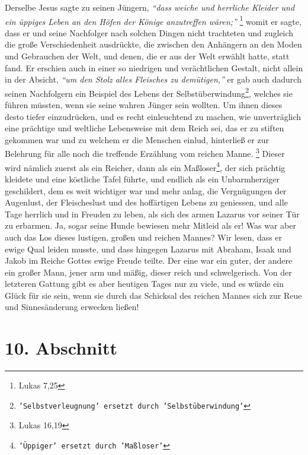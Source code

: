 Derselbe Jesus sagte
zu seinen Jüngern,
\textit{"`dass weiche und herrliche Kleider und ein üppiges Leben an
den Höfen der Könige anzutreffen wären;"'}
\footnote{Lukas 7,25}
womit er sagte,
dass er und seine Nachfolger nach solchen Dingen nicht trachteten und zugleich
die große Verschiedenheit ausdrückte, die zwischen den Anhängern an den Moden
und Gebrauchen der Welt, und denen, die er aus der Welt erwählt hatte, statt
fand. Er erschien auch in einer so niedrigen und verächtlichen Gestalt, nicht
allein in der Absicht,
\textit{"`um den Stolz alles Fleisches zu demütigen,"'} er gab
auch dadurch seinen Nachfolgern ein Beispiel des Lebens der 
Selbstüberwindung\footnote{\texttt{'Selbstverleugnung' ersetzt durch 'Selbstüberwindung'}},
welches sie führen müssten, wenn sie seine wahren Jünger sein wollten. Um ihnen
dieses desto tiefer einzudrücken, und es recht einleuchtend zu machen, wie
unverträglich eine prächtige und weltliche Lebensweise mit dem Reich sei, das
er zu stiften gekommen war und zu welchem er die Menschen einlud, hinterließ
er zur Belehrung für alle noch die treffende Erzählung vom reichen
Manne.
\footnote{Lukas 16,19}
Dieser wird nämlich zuerst als ein Reicher, dann als
ein Maßloser\footnote{\texttt{'Üppiger' ersetzt durch 'Maßloser'}}, der sich prächtig 
kleidete und eine köstliche Tafel führte, und
endlich als ein Unbarmherziger geschildert, dem es weit wichtiger war und mehr
anlag, die Vergnügungen der Augenlust, der Fleischeslust und des hoffärtigen
Lebens zu geniessen, und alle Tage herrlich und in Freuden zu leben, als sich des
armen Lazarus vor seiner Tür zu erbarmen. Ja, sogar seine Hunde 
bewiesen mehr
Mitleid als er! Was war aber auch das Los dieses lustigen, großen und reichen
Mannes? Wir lesen, dass er ewige Qual leiden musste, und dass hingegen Lazarus mit
Abraham, Isaak und Jakob 
im Reiche Gottes ewige Freude teilte. Der eine war ein
guter, der andere ein großer Mann, jener arm und mäßig, dieser reich und
schwelgerisch. Von der letzteren Gattung gibt es aber heutigen Tages nur zu
viele, und es würde ein Glück für sie sein, wenn sie durch das Schicksal des
reichen Mannes sich zur Reue und Sinnesänderung erwecken ließen!

\section{10. Abschnitt} \label{kap14_ab10}

